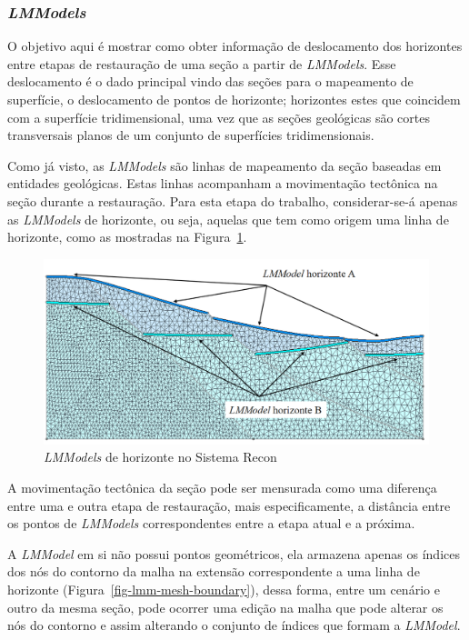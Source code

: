 \subsubsection{\textit{LMModels}}

O objetivo aqui é mostrar como obter informação de deslocamento dos horizontes entre etapas de restauração de uma seção a partir de \textit{LMModels}. Esse deslocamento é o dado principal vindo das seções para o mapeamento de superfície, o deslocamento de pontos de horizonte; horizontes estes que coincidem com a superfície tridimensional, uma vez que as seções geológicas são cortes transversais planos de um conjunto de superfícies tridimensionais.

Como já visto, as \textit{LMModels} são linhas de mapeamento da seção baseadas em entidades geológicas. Estas linhas acompanham a movimentação tectônica na seção durante a restauração. Para esta etapa do trabalho, considerar-se-á apenas as \textit{LMModels} de horizonte, ou seja, aquelas que tem como origem uma linha de horizonte, como as mostradas na Figura~\ref{fig-lmm-horizons}.

\begin{figure} [H]
  \begin{center}
    \includegraphics[width=350pt]{images/fig-lmmodel-example}
    \caption{\textit{LMModels} de horizonte no Sistema Recon}\label{fig-lmm-horizons}
  \end{center}
\end{figure}

A movimentação tectônica da seção pode ser mensurada como uma diferença entre uma e outra etapa de restauração, mais especificamente, a distância entre os pontos de \textit{LMModels} correspondentes entre a etapa atual e a próxima.

A \textit{LMModel} em si não possui pontos geométricos, ela armazena apenas os índices dos nós do contorno da malha na extensão correspondente a uma linha de horizonte (Figura~\ref{fig-lmm-mesh-boundary}), dessa forma, entre um cenário e outro da mesma seção, pode ocorrer uma edição na malha que pode alterar os nós do contorno e assim alterando o conjunto de índices que formam a \textit{LMModel}.


